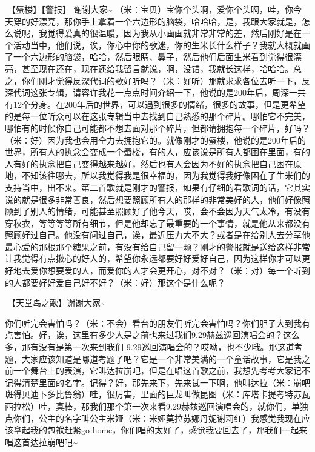 \documentclass[
]{book}
\begin{document}
🎵【蜃楼】【警报】
谢谢大家\textasciitilde{} （米：宝贝）宝你个头啊，爱你个头啊，哇，你今天穿的好漂亮，那你手上拿着一个六边形的脑袋，哈哈哈，是，我跟大家就是，怎么说呢，我觉得爱真的很温暖，因为我从小画画就非常非常的差，然后刚好是在一个活动当中，他们说，诶，你心中你的歌迷，你的生米长什么样子？我就大概就画了一个六边形的脑袋，哈哈，然后眼睛、鼻子，然后他们后面生米看到觉得很漂亮，甚至现在还在，现在还给我留言就说，啊，没错，我就长这样，哈哈哈。总之，你们刚才觉得反深代词的歌好听吗？（米：好听）那就求求各位去听一下，反深代词这张专辑，请容许我花一点点时间介绍一下，他说的是200年后，周深一共有12个分身。在200年后的世界，可以遇到很多的情绪，很多的故事，但是更希望的是每一位听众可以在这张专辑当中去找到自己熟悉的那个碎片。哪怕它不完美，哪怕有的时候你自己可能都不想去面对那个碎片，但都请拥抱每一个碎片，好吗？（米：好）因为我也会用全力去拥抱它的。就像刚才的蜃楼，他说的是200年后的世界，所有人的执念会变成一个蜃楼，有的人，应该说是所有人都困在里面，有的人有好的执念把自己变得越来越好，然后也有人会因为不好的执念把自己困在原地，不知该往哪去，所以我觉得我是很幸福的，因为我觉得我好像困在了生米们的支持当中，出不来。第二首歌就是刚才的警报，如果有仔细的看歌词的话，它其实说的就是很多非常善良，然后想要照顾所有人的那样的非常美好的人，他们好像照顾到了别人的情绪，可能甚至照顾好了他今天，哎，会不会因为天气太冷，有没有穿秋衣，等等等等所有细节，但是他却忘了最重要的一个事情，就是他从来都没有照顾好过自己。他没有问过自己，诶，最近压力大不大？或者是在给别人去分享他最心爱的那根那个糖果之前，有没有给自己留一颗？刚才的警报就是送给这样非常让我觉得有点揪心的好人的，希望你永远都要好好爱好自己，因为这样你才可以更好地去爱你想要爱的人，而爱你的人才会更开心，对不对？（米：对）每一个听到的人都要好好爱自己好不好？（米：好）那这个是什么呢？

🎵【天堂岛之歌】谢谢大家\textasciitilde{}

你们听完会害怕吗？（米：不会）看台的朋友们听完会害怕吗？你们胆子大到我有点害怕。好，诶，这里有多少人是之前也来过我们9.29赫兹巡回演唱会的？这么多，那有没有是第一次来到我们 9.29巡回演唱会的？哎呦，也不少哦。那这道考题，大家应该知道是哪道考题了吧？它是一个非常美满的一个童话故事，它是我之前一个舞台上的表演，它叫达拉崩吧，但是在唱这首歌之前，我想先考考大家记不记得清楚里面的名字。记得？好，那先来下，先来试一下啊，他叫达拉（米：崩吧斑得贝迪卜多比鲁翁）哇，很厉害，里面的巨龙叫做昆图（米：库塔卡提考特苏瓦西拉松）哇，真棒，那我们那个第一次来看9.29赫兹巡回演唱会的，就你们，单独点你们，公主的名字叫公主米娅（米：米娅莫拉苏娜丹妮谢莉红）我感觉我现在应该拿起我的包袱赶紧go home，你们唱的太好了，感觉我要回去了，那我们一起来唱这首达拉崩吧吧\textasciitilde{}
\end{document}
